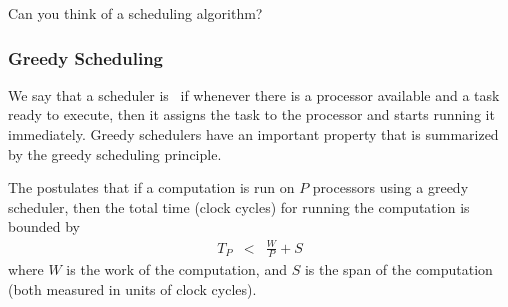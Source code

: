 \begin{cluster}
\label{grp:tch:analysis::models::think}

\begin{teachask}
\label{tch:analysis::models::think}
Can you think of a scheduling algorithm?

\end{teachask}
\end{cluster}


\subsubsection{Greedy Scheduling}
\label{sec:analysis::models::greedy-scheduling}

\begin{cluster}
\label{grp:def:analysis::models::greedy-scheduler}

\begin{definition}
\label{def:analysis::models::greedy-scheduler}
We say that a scheduler is~ if whenever there is a
processor available and a task ready to execute, then it assigns the
task to the processor and starts running it immediately.  Greedy
schedulers have an important property that is summarized by the greedy
scheduling principle.

\end{definition}
\end{cluster}

\begin{cluster}
\label{grp:def:analysis::models::greedy}

\begin{definition}
\label{def:analysis::models::greedy}
The  postulates that if a
computation is run on $P$ processors using a greedy scheduler, then
the total time (clock cycles) for running the computation is bounded
by
\[
\begin{array}{lll}
T_P & < & \frac{W}{P} + S
\end{array}
\]
where $W$ is the work of the computation, and $S$ is the span of the
computation (both measured in units of clock cycles).

\end{definition}
\end{cluster}

